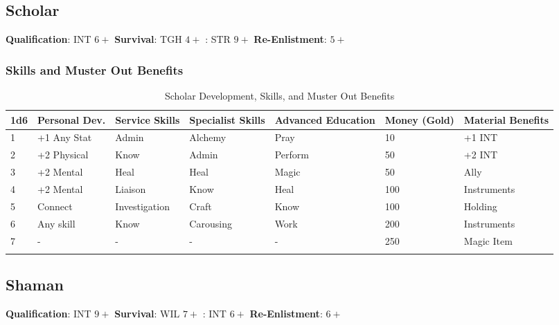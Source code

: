 \documentclass[itdr/core]{subfiles}
\begin{document}
\subsection{Scholar}
\textbf{Qualification}: INT $6+$
\textbf{Survival}: TGH $4+$
: STR $9+$
\textbf{Re-Enlistment}: $5+$
\subsubsection{Skills and Muster Out Benefits}
\begin{longtable}{p{} p{} p{} p{} p{} p{} p{}}
\hline
\textbf{1d6} & \textbf{Personal Dev.} & \textbf{Service Skills} & \textbf{Specialist Skills} & \textbf{Advanced Education} & \textbf{Money (Gold)} & \textbf{Material Benefits} \\
\hline
1 & +1 Any Stat & Admin & Alchemy & Pray & 10 & +1 INT \\
2 & +2 Physical & Know & Admin & Perform & 50 & +2 INT \\
3 & +2 Mental & Heal & Heal & Magic & 50 & Ally \\
4 & +2 Mental & Liaison & Know & Heal & 100 & Instruments \\
5 & Connect & Investigation & Craft & Know & 100 & Holding \\
6 & Any skill & Know & Carousing & Work & 200 & Instruments \\
7 & - & - & - & - & 250 & Magic Item \\
\hline
\caption{Scholar Development, Skills, and Muster Out Benefits}
\end{longtable}

\subsection{Shaman}
\textbf{Qualification}: INT $9+$
\textbf{Survival}: WIL $7+$
: INT $6+$
\textbf{Re-Enlistment}: $6+$
\end{document}

